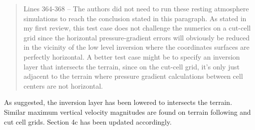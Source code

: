 \documentclass{article}
\begin{document}
\begin{quotation}
 Lines 364-368 -- The authors did not need to run these resting atmosphere 
 simulations to reach the conclusion stated in this paragraph. As stated in my first 
 review, this test case does not challenge the numerics on a cut-cell grid since the horizontal pressure-gradient errors will obviously be reduced in the vicinity of the 
 low level inversion where the coordinates surfaces are perfectly horizontal. A better 
 test case might be to specify an inversion layer that intersects the terrain, since on 
 the cut-cell grid, it's only just adjacent to the terrain where pressure gradient 
 calculations between cell centers are not horizontal.   
\end{quotation}
As suggested, the inversion layer has been lowered to intersects the terrain.  Similar maximum vertical velocity magnitudes are found on terrain following and cut cell grids.  Section 4c has been updated accordingly.
\end{document}
